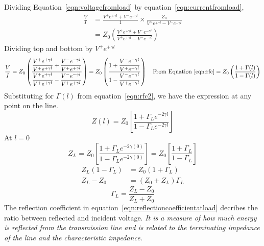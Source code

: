 Dividing Equation~\eqref{eqn:voltagefromload} by equation~\eqref{eqn:currentfromload},
\begin{align*}
\frac{V}{I} &= \frac{V^+e^{+\gamma l}+V^-e^{-\gamma l}}{1}\times \frac{Z_0}{V^+e^{+\gamma l}-V^-e^{-\gamma l}}\\
&= Z_0\left( \frac{V^+e^{+\gamma l}+V^-e^{-\gamma l}}{V^+e^{+\gamma l}-V^-e^{-\gamma l}}\right) 
\end{align*}
Dividing top and bottom by $V^+e^{+\gamma l}$
\begin{dmath*}
\frac{V}{I} = Z_0\left( \frac{\dfrac{V^+e^{+\gamma l}}{V^+e^{+\gamma l}}+\dfrac{V^-e^{-\gamma l}}{V^+e^{+\gamma l}}}{\dfrac{V^+e^{+\gamma l}}{V^+e^{+\gamma l}}-\dfrac{V^-e^{-\gamma l}}{V^+e^{+\gamma l}}}\right)
= Z_0\left( \frac{1 + \dfrac{V^-e^{-\gamma l}}{V^+e^{+\gamma l}}}{1 - \dfrac{V^-e^{-\gamma l}}{V^+e^{+\gamma l}}}\right)\quad\text{From Equation~\ref{eqn:rfc}}
=Z_0\left( \frac{1+\Gamma (l)}{1 -\Gamma (l)}\right)
\end{dmath*}
Substituting for $\Gamma (l)$ from equation~\eqref{eqn:rfc2}, we have the expression at any point on the line.
\begin{equation}
Z(l) = Z_0\left[ \frac{1 + \Gamma_L e^{-2\gamma l}}{1 - \Gamma_L e^{-2\gamma l}}\right] 
\end{equation}
At $l = 0$ 
\begin{dmath}
Z_L = Z_0\left[ \frac{1 + \Gamma_L e^{-2\gamma (0)}}{1 - \Gamma_L e^{-2\gamma (0)}}\right] 
= Z_0\left[\frac{1 + \Gamma_L}{1 - \Gamma_L}\right] 
\end{dmath}
\begin{align*}
Z_L(1 - \Gamma_L) &= Z_0(1 + \Gamma_L)\\
Z_L - Z_0 &= (Z_0 + Z_L)\Gamma_L
\end{align*}
\begin{equation}
\Gamma_L = \frac{Z_L - Z_0}{Z_L + Z_0}
\label{eqn:reflectioncoefficientatload}
\end{equation}
The reflection coefficient in equation~\eqref{eqn:reflectioncoefficientatload} decribes the ratio between reflected and incident voltage. \emph{It is a measure of how much energy is reflected from the transmission line and is related to the terminating impedance of the line and the characteristic impedance.}



